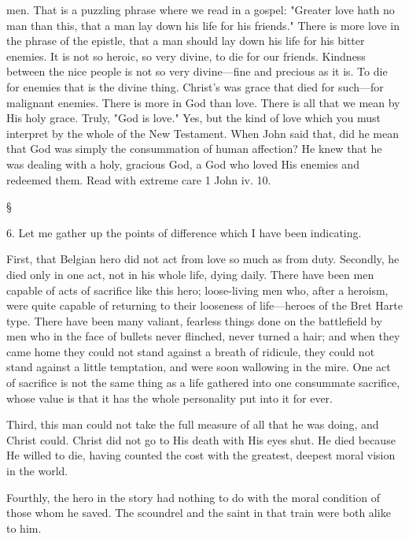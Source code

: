 \documentclass[12pt,a5paper,twoside,titlepage]{book}
\begin{document}
men. That is a puzzling phrase where we read 
in a gospel: "Greater love hath no man than 
this, that a man lay down his life for his 
friends." There is more love in the phrase 
of the epistle, that a man should lay down 
his life for his bitter enemies. It is not so 
heroic, so very divine, to die for our friends. 
Kindness between the nice people is not so 
very divine---fine and precious as it is. To die 
for enemies that is the divine thing. Christ's 
was grace that died for such---for malignant 
enemies. There is more in God than love. 
There is all that we mean by His holy grace. 
Truly, "God is love." Yes, but the kind of love 
which you must interpret by the whole of 
the New Testament. When John said that, did 
he mean that God was simply the consummation 
of human affection? He knew that he 
was dealing with a holy, gracious God, a God 
who loved His enemies and redeemed them. 
Read with extreme care 1 John iv. 10. 

\begin{center} \S \end{center}

6. Let me gather up the points of difference 
which I have been indicating. 

First, that Belgian hero did not act from love 
so much as from duty. Secondly, he died only 
in one act, not in his whole life, dying daily. 
There have been men capable of acts of sacrifice 
like this hero; loose-living men who, after 
a heroism, were quite capable of returning to 
their looseness of life---heroes of the Bret Harte 
type. There have been many valiant, fearless 
things done on the battlefield by men who in 
the face of bullets never flinched, never turned 
a hair; and when they came home they could 
not stand against a breath of ridicule, they 
could not stand against a little temptation, and 
were soon wallowing in the mire. One act of 
sacrifice is not the same thing as a life gathered 
into one consummate sacrifice, whose value is 
that it has the whole personality put into it 
for ever. 

Third, this man could not take the full 
measure of all that he was doing, and Christ 
could. Christ did not go to His death with 
His eyes shut. He died because He willed to 
die, having counted the cost with the greatest, 
deepest moral vision in the world. 

Fourthly, the hero in the story had nothing 
to do with the moral condition of those whom 
he saved. The scoundrel and the saint in that 
train were both alike to him. 
\end{document}
